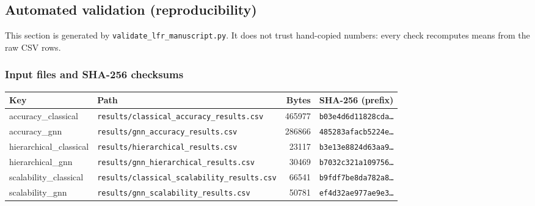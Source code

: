 \subsection{Automated validation (reproducibility)}
This section is generated by \texttt{validate\_lfr\_manuscript.py}. It does not trust hand-copied numbers: every check recomputes means from the raw CSV rows.
\subsubsection{Input files and SHA-256 checksums}
\footnotesize
\begin{tabular}{lp{8cm}rr}
\toprule
\textbf{Key} & \textbf{Path} & \textbf{Bytes} & \textbf{SHA-256 (prefix)} \\
\midrule
accuracy\_classical & \texttt{results/classical\_accuracy\_results.csv} & 465977 & \texttt{b03e4d6d11828cda\ldots} \\
accuracy\_gnn & \texttt{results/gnn\_accuracy\_results.csv} & 286866 & \texttt{485283afacb5224e\ldots} \\
hierarchical\_classical & \texttt{results/hierarchical\_results.csv} & 23117 & \texttt{b3e13e8824d63aa9\ldots} \\
hierarchical\_gnn & \texttt{results/gnn\_hierarchical\_results.csv} & 30469 & \texttt{b7032c321a109756\ldots} \\
scalability\_classical & \texttt{results/classical\_scalability\_results.csv} & 66541 & \texttt{b9fdf7be8da782a8\ldots} \\
scalability\_gnn & \texttt{results/gnn\_scalability\_results.csv} & 50781 & \texttt{ef4d32ae977ae9e3\ldots} \\
\bottomrule
\end{tabular}
\normalsize
